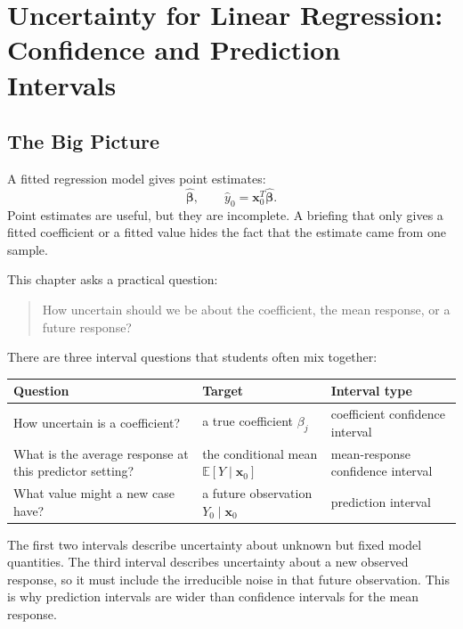 \chapter[Uncertainty for Linear Regression]{Uncertainty for Linear Regression: Confidence and Prediction Intervals}
\label{chap:uncertainty-linear-regression-confidence-prediction-intervals}
\label{chap:uncertainty-confidence-prediction-intervals}

\section{The Big Picture}

A fitted regression model gives point estimates:
\begin{equation}
  \widehat{\boldsymbol{\beta}},
  \qquad
  \widehat{y}_0 = \mathbf{x}_0^T\widehat{\boldsymbol{\beta}}.
\end{equation}
Point estimates are useful, but they are incomplete.  A briefing that only gives a fitted coefficient or a fitted value hides the fact that the estimate came from one sample.

This chapter asks a practical question:
\begin{quote}
  How uncertain should we be about the coefficient, the mean response, or a future response?
\end{quote}

There are three interval questions that students often mix together:
\begin{center}
\begin{tabular}{p{}p{}p{}}
\toprule
\textbf{Question} & \textbf{Target} & \textbf{Interval type} \\
\midrule
How uncertain is a coefficient? & a true coefficient \(\beta_j\) & coefficient confidence interval \\
What is the average response at this predictor setting? & the conditional mean \(\mathbb{E}[Y\mid \mathbf{x}_0]\) & mean-response confidence interval \\
What value might a new case have? & a future observation \(Y_0\mid \mathbf{x}_0\) & prediction interval \\
\bottomrule
\end{tabular}
\end{center}

The first two intervals describe uncertainty about unknown but fixed model quantities.  The third interval describes uncertainty about a new observed response, so it must include the irreducible noise in that future observation.  This is why prediction intervals are wider than confidence intervals for the mean response.

